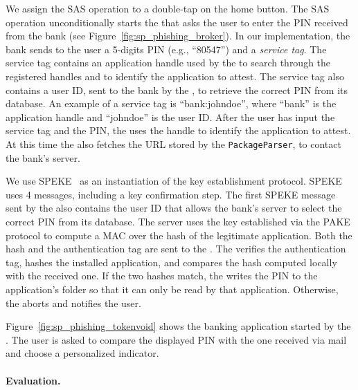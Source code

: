 We assign the SAS operation to a double-tap on the home button.
The SAS operation unconditionally starts the \secmodule{} that asks the user to enter the PIN received from the bank (see Figure~\ref{fig:sp_phishing_broker}).
In our implementation, the bank sends to the user a 5-digits PIN (e.g., ``80547'')
and a \emph{service tag}. The service tag contains an application handle used by the \secmodule{}
to search through the registered handles and to identify the application to attest.
The service tag also contains a user ID, sent to the bank by the \secmodule{}, to retrieve the correct PIN from its database.
An example of a service tag is ``bank:johndoe'', where ``bank'' is the application handle and ``johndoe'' is the user ID.
After the user has input the service tag and the PIN, the \secmodule{} uses the handle to identify the application to attest.
At this time the \secmodule{} also fetches the URL stored by the \texttt{PackageParser}, to contact the bank's server.

We use SPEKE~\cite{speke} as an instantiation of the key establishment protocol.
SPEKE uses 4 messages, including a key confirmation step.
The first SPEKE message sent by the \secmodule{} also contains the user ID that allows the bank's server to select the correct PIN from its database.
The server uses the key established via the PAKE protocol to compute a MAC over the hash of the legitimate application.
Both the hash and the authentication tag are sent to the \secmodule{}.
The \secmodule{} verifies the authentication tag, hashes the installed application, and compares the hash computed locally with the
received one. If the two hashes match, the \secmodule{} writes the PIN to the application's folder so that it can only be read by
that application. Otherwise, the \secmodule{} aborts and notifies the user.

Figure~\ref{fig:sp_phishing_tokenvoid} shows the banking application started by the \secmodule{}.
The user is asked to compare the displayed PIN with the one received via mail and choose a personalized indicator.

\paragraph{Evaluation.}

